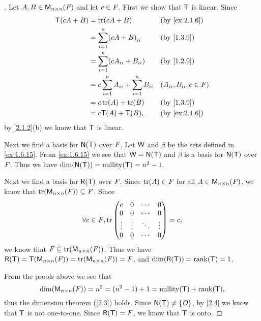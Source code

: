 \begin{proof}[]
  Let \(A, B \in \mathsf{M}_{{n} \times n}({\mathit{F}})\) and let \(c \in \mathit{F}\).
  First we show that \(\mathsf{T}\) is linear.
  Since
  \begin{align*}
    \T(cA + B) & = \tr[cA + B]                                       &  & \text{(by \cref{ex:2.1.6})}  \\
               & = \sum_{i = 1}^n \pa{cA + B}_{i i}                  &  & \text{(by \cref{1.3.9})}     \\
               & = \sum_{i = 1}^n \pa{cA_{i i} + B_{i i}}            &  & \text{(by \cref{1.2.9})}     \\
               & = c \sum_{i = 1}^n A_{i i} + \sum_{i = 1}^n B_{i i} &  & (A_{i i}, B_{i i}, c \in \F) \\
               & = c \tr[A] + \tr[B]                                 &  & \text{(by \cref{1.3.9})}     \\
               & = c \T(A) + \T(B),                                  &  & \text{(by \cref{ex:2.1.6})}
  \end{align*}
  by \cref{2.1.2}(b) we know that \(\mathsf{T}\) is linear.

  Next we find a basis for \(\ns{\T}\) over \(\mathit{F}\).
  Let \(\mathsf{W}\) and \(\beta\) be the sets defined in \cref{ex:1.6.15}.
  From \cref{ex:1.6.15} we see that \(\W = \ns{\T}\) and \(\beta\) is a basis for \(\ns{\T}\) over \(\mathit{F}\).
  Thus we have \(\dim(\ns{\T}) = \nt{\T} = n^2 - 1\).

  Next we find a basis for \(\rg{\T}\) over \(\mathit{F}\).
  Since \(\tr[A] \in \F\) for all \(A \in \mathsf{M}_{{n} \times n}({\mathit{F}})\), we know that \(\tr[\ms{n}{n}{\F}] \subseteq \F\).
  Since
  \[
    \forall c \in \F, \tr\begin{pmatrix}
      c      & 0      & \cdots & 0      \\
      0      & 0      & \cdots & 0      \\
      \vdots & \vdots & \ddots & \vdots \\
      0      & 0      & \cdots & 0
    \end{pmatrix} = c,
  \]
  we know that \(\F \subseteq \tr[\ms{n}{n}{\F}]\).
  Thus we have \(\rg{\T} = \T(\ms{n}{n}{\F}) = \tr[\ms{n}{n}{\F}] = \F\), and \(\dim(\rg{\T}) = \rk{\T} = 1\).

  From the proofs above we see that
  \[
    \dim(\ms{n}{n}{\F}) = n^2 = (n^2 - 1) + 1 = \nt{\T} + \rk{\T},
  \]
  thus the dimension theorem (\cref{2.3}) holds.
  Since \(\ns{\T} \neq \set{\zm}\), by \cref{2.4} we know that \(\mathsf{T}\) is not one-to-one.
  Since \(\rg{\T} = \F\), we know that \(\mathsf{T}\) is onto.
\end{proof}

